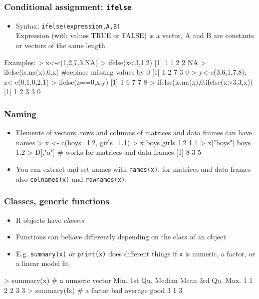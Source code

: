 \documentclass[xcolor=svgnames,handout]{beamer}
\newcommand{\code}[1]{\texttt{#1}}
\let\overbatim\verbatim
\let\endoverbatim\endverbatim
\newenvironment{vcode}%
{\bgroup\baselineskip=0.8\baselineskip\overbatim}%
{\endoverbatim\egroup}
\newcounter{demo}
\newcommand{\Demo}{\stepcounter{demo}\frametitle{Demo \arabic{demo}}}
\begin{document}
\begin{frame}[fragile]
  \frametitle{Conditional assignment: \texttt{ifelse}}
  \begin{itemize}
  \item Syntax: \code{ifelse(expression,A,B)} \\
Expression (with values TRUE or FALSE) is a vector, A and B are constants or vectors of the same length.
 \end{itemize}
Examples: %
\begin{vcode}
> x<-c(1,2,7,3,NA)
> ifelse(x<3,1,2)
[1]  1  1  2  2 NA
> ifelse(is.na(x),0,x) #replace missing values by 0 
[1] 1 2 7 3 0
>  y<-c(3,6,1,7,8);  z<-c(0,1,0,2,1)
>  ifelse(z==0,x,y)
[1] 1 6 7 7 8
>  ifelse(is.na(x),0,ifelse(x>3,3,x)) 
[1] 1 2 3 3 0
\end{vcode}
\end{frame}

\begin{frame}[fragile]
  \frametitle{Naming}
  \begin{itemize}
  \item Elements of vectors, rows and columns of matrices and data frames can have names
\begin{vcode}
> x <- c(boys=1.2, girls=1.1)
> x
 boys girls 
  1.2   1.1 
> x["boys"]
boys 
 1.2
> D[,"a"]  # works for matrices and data frames
[1] 8 3 5
\end{vcode}
  \item You can extract and set names with \code{names(x)}; for matrices and data frames also \code{colnames(x)} and \code{rownames(x)};
 \end{itemize}
\end{frame}


\begin{frame}[fragile]
  \frametitle{Classes, generic functions}
  \begin{itemize}
  \item R objects have \emph{classes} 
  \item Functions can behave differently depending on the class of an
    object 
  \item E.g. \code{summary(x)} or \code{print(x)} does different
    things if \code{x} is numeric, a factor, or a linear model fit
  \end{itemize}
\begin{vcode}
  > summary(x)  # a numeric vector
   Min. 1st Qu.  Median    Mean 3rd Qu.    Max. 
      1       1       2       2       3       3 
> summary(fx) # a factor
    bad average    good 
      3       1       3 
\end{vcode}
\end{frame}
\end{document}
